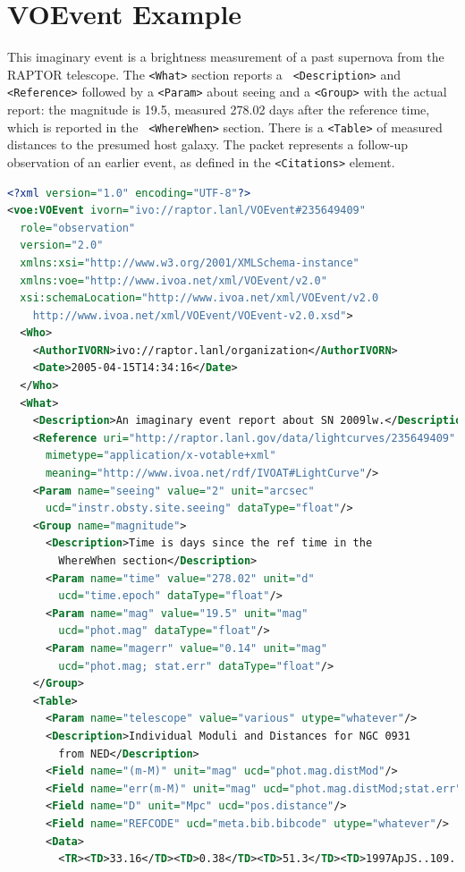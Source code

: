 \documentclass[11pt,a4paper]{ivoa}
\begin{document}
\section{VOEvent Example}
\label{sec:4}
This imaginary event is a brightness measurement of a past supernova from the 
RAPTOR \citep{bib10} telescope. The {\tt <What>} section reports a {\tt 
<Description>} and {\tt <Reference>} followed by a {\tt <Param>} about seeing 
and a {\tt <Group>} with the actual report: the magnitude is 19.5, measured 
278.02 days after the reference time, which is reported in the {\tt 
<WhereWhen>} section. There is a {\tt <Table>} of measured distances to the 
presumed host galaxy. The packet represents a follow-up observation of an 
earlier event, as defined in the {\tt <Citations>} element. 
\begin{lstlisting}[language=XML]
<?xml version="1.0" encoding="UTF-8"?>
<voe:VOEvent ivorn="ivo://raptor.lanl/VOEvent#235649409" 
  role="observation" 
  version="2.0"
  xmlns:xsi="http://www.w3.org/2001/XMLSchema-instance"
  xmlns:voe="http://www.ivoa.net/xml/VOEvent/v2.0"
  xsi:schemaLocation="http://www.ivoa.net/xml/VOEvent/v2.0     
    http://www.ivoa.net/xml/VOEvent/VOEvent-v2.0.xsd">
  <Who>
    <AuthorIVORN>ivo://raptor.lanl/organization</AuthorIVORN>
    <Date>2005-04-15T14:34:16</Date>
  </Who>
  <What>
    <Description>An imaginary event report about SN 2009lw.</Description>
    <Reference uri="http://raptor.lanl.gov/data/lightcurves/235649409"
      mimetype="application/x-votable+xml" 
      meaning="http://www.ivoa.net/rdf/IVOAT#LightCurve"/>
    <Param name="seeing" value="2" unit="arcsec" 
      ucd="instr.obsty.site.seeing" dataType="float"/>
    <Group name="magnitude">
      <Description>Time is days since the ref time in the 
        WhereWhen section</Description>
      <Param name="time" value="278.02" unit="d" 
        ucd="time.epoch" dataType="float"/>
      <Param name="mag" value="19.5" unit="mag" 
        ucd="phot.mag" dataType="float"/>
      <Param name="magerr" value="0.14" unit="mag" 
        ucd="phot.mag; stat.err" dataType="float"/>
    </Group>
    <Table>
      <Param name="telescope" value="various" utype="whatever"/>
      <Description>Individual Moduli and Distances for NGC 0931 
        from NED</Description>
      <Field name="(m-M)" unit="mag" ucd="phot.mag.distMod"/>
      <Field name="err(m-M)" unit="mag" ucd="phot.mag.distMod;stat.err"/>
      <Field name="D" unit="Mpc" ucd="pos.distance"/>
      <Field name="REFCODE" ucd="meta.bib.bibcode" utype="whatever"/>
      <Data>
        <TR><TD>33.16</TD><TD>0.38</TD><TD>51.3</TD><TD>1997ApJS..109..333W</TD></TR>

\end{lstlisting}
\end{document}
